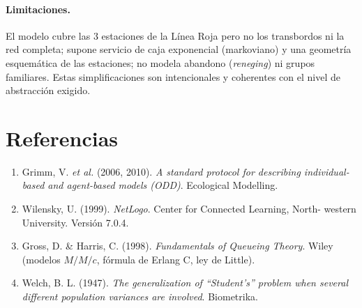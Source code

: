 \documentclass[11pt,a4paper]{article}
\begin{document}
\paragraph{Limitaciones.} El modelo cubre las 3 estaciones de la Línea Roja pero no
los transbordos ni la red completa; supone servicio de caja exponencial (markoviano)
y una geometría esquemática de las estaciones; no modela abandono (\emph{reneging})
ni grupos familiares. Estas simplificaciones son intencionales y coherentes con el
nivel de abstracción exigido.

\section*{Referencias}
\begin{enumerate}[nosep]
  \item Grimm, V. \emph{et al.} (2006, 2010). \emph{A standard protocol for
  describing individual-based and agent-based models (ODD)}. Ecological Modelling.
  \item Wilensky, U. (1999). \emph{NetLogo}. Center for Connected Learning, North-
  western University. Versión 7.0.4.
  \item Gross, D. \& Harris, C. (1998). \emph{Fundamentals of Queueing Theory}.
  Wiley (modelos $M/M/c$, fórmula de Erlang C, ley de Little).
  \item Welch, B. L. (1947). \emph{The generalization of ``Student's'' problem when
  several different population variances are involved}. Biometrika.
\end{enumerate}
\end{document}
